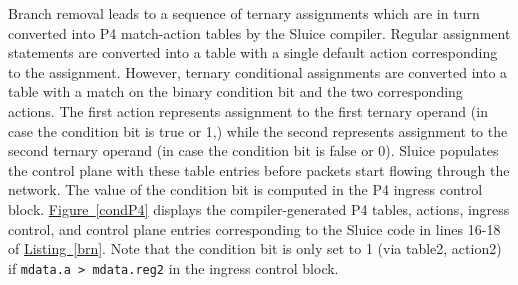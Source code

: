\documentclass[12pt, oneside]{article}
\newcommand{\irref}[2]{\hyperref[#2]{#1~\ref{#2}}}
\begin{document}
Branch removal leads to a sequence of ternary assignments which are in turn converted into P4 match-action tables by the Sluice compiler. Regular assignment statements are converted into a table with a single default action corresponding to the assignment. However, ternary conditional assignments are converted into a table with a match on the binary condition bit and the two corresponding actions. The first action represents assignment to the first ternary operand (in case the condition bit is true or 1,) while the second represents assignment to the second ternary operand (in case the condition bit is false or 0). Sluice populates the control plane with these table entries before packets start flowing through the network. The value of the condition bit is computed in the P4 ingress control block. \irref{Figure}{condP4} displays the compiler-generated P4 tables, actions, ingress control, and control plane entries corresponding to the Sluice code in lines 16-18 of \irref{Listing}{brn}. Note that the condition bit is only set to 1 (via table2, action2) if \texttt{mdata.a > mdata.reg2} in the ingress control block. 
\end{document}
